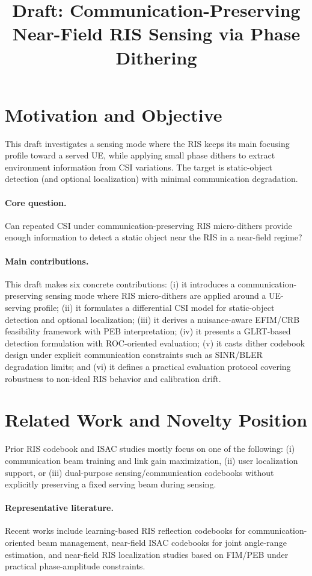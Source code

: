 \documentclass[11pt,a4paper]{article}
\title{Draft: Communication-Preserving Near-Field RIS Sensing via Phase Dithering}
\author{}
\date{}
\begin{document}
\maketitle

\section{Motivation and Objective}
This draft investigates a sensing mode where the RIS keeps its main focusing profile toward a served UE, while applying small phase dithers to extract environment information from CSI variations. The target is static-object detection (and optional localization) with minimal communication degradation.

\paragraph{Core question.}
Can repeated CSI under communication-preserving RIS micro-dithers provide enough information to detect a static object near the RIS in a near-field regime?

\paragraph{Main contributions.}
This draft makes six concrete contributions: (i) it introduces a communication-preserving sensing mode where RIS micro-dithers are applied around a UE-serving profile; (ii) it formulates a differential CSI model for static-object detection and optional localization; (iii) it derives a nuisance-aware EFIM/CRB feasibility framework with PEB interpretation; (iv) it presents a GLRT-based detection formulation with ROC-oriented evaluation; (v) it casts dither codebook design under explicit communication constraints such as SINR/BLER degradation limits; and (vi) it defines a practical evaluation protocol covering robustness to non-ideal RIS behavior and calibration drift.

\section{Related Work and Novelty Position}
Prior RIS codebook and ISAC studies mostly focus on one of the following: (i) communication beam training and link gain maximization, (ii) user localization support, or (iii) dual-purpose sensing/communication codebooks without explicitly preserving a fixed serving beam during sensing.

\paragraph{Representative literature.}
Recent works include learning-based RIS reflection codebooks for communication-oriented beam management, near-field ISAC codebooks for joint angle-range estimation, and near-field RIS localization studies based on FIM/PEB under practical phase-amplitude constraints.
\end{document}
